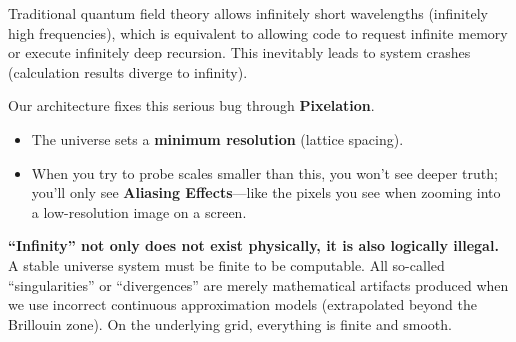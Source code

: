 Traditional quantum field theory allows infinitely short wavelengths (infinitely high frequencies), which is equivalent to allowing code to request infinite memory or execute infinitely deep recursion. This inevitably leads to system crashes (calculation results diverge to infinity).

Our architecture fixes this serious bug through \textbf{Pixelation}.

\begin{itemize}
\item The universe sets a \textbf{minimum resolution} (lattice spacing).

\item When you try to probe scales smaller than this, you won't see deeper truth; you'll only see \textbf{Aliasing Effects}---like the pixels you see when zooming into a low-resolution image on a screen.
\end{itemize}

\textbf{``Infinity'' not only does not exist physically, it is also logically illegal.} A stable universe system must be finite to be computable. All so-called ``singularities'' or ``divergences'' are merely mathematical artifacts produced when we use incorrect continuous approximation models (extrapolated beyond the Brillouin zone). On the underlying grid, everything is finite and smooth.

